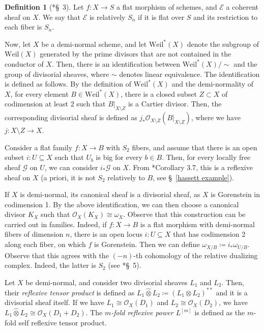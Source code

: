 \documentclass{amsart}
\newcommand{\cE}{\mathcal{E}}
\newcommand{\cG}{\mathcal{G}}
\theoremstyle{definition}
\newtheorem{Def}[theorem]{Definition}
\newcommand{\rar}{\rightarrow}
\def\O#1.{\mathcal {O}_{#1}}
\def\subs#1.{_{#1}}
\begin{document}
\begin{Def}[\cite{HK04}*{\S~3}]Let $f \colon X\to S $ a flat morphism of schemes, and $\cE$ a coherent sheaf on $X$. We say that $\cE$ is relatively $S_n$ if it is flat over $S$ and its restriction to each fiber is $S_n.$
\end{Def}

Now, let $X$ be a demi-normal scheme, and let $\mathrm{Weil}^*(X)$ denote the subgroup of $\mathrm{Weil}(X)$ generated by the prime divisors that are not contained in the conductor of $X$.
Then, there is an identification between $\mathrm{Weil}^*(X)/\sim$ and the group of divisorial sheaves, where $\sim$ denotes linear equivalence.
The identification is defined as follows.
By the definition of $\mathrm{Weil}^*(X)$ and the demi-normality of $X$, for every element $B \in \mathrm{Weil}^*(X)$, there is a closed subset $Z \subset X$ of codimension at least 2 such that $B| \subs X \setminus Z.$ is a Cartier divisor.
Then, the corresponding divisorial sheaf is defined as $j_* \O X \setminus Z. (B| \subs X \setminus Z.)$, where we have $j \colon X \setminus Z \rar X$.

Consider a flat family $f \colon X\to B$ with $S_2$ fibers, and assume that there is an open subset $i \colon U\subseteq X$ such that $U_b$ is big for every $b\in B$.
Then, for every locally free sheaf $\cG$ on $U$, we can consider $i_*\cG$ on $X$.
From \cite{HK04}*{Corollary 3.7}, this is a reflexive sheaf on $X$ (a priori, it is not $S_2$ relatively to $B$, see \S~\ref{hassett example}).

If $X$ is demi-normal, its canonical sheaf is a divisorial sheaf, as $X$ is Gorenstein in codimension 1.
By the above identification, we can then choose a canonical divisor $K_X$ such that $\O X. (K_X) \cong \omega_X$.
Observe that this construction can be carried out in families.
Indeed, if $f \colon X\to B$ is a flat morphism with demi-normal fibers of dimension $n$, there is an open locus $i \colon U\subseteq X$ that has codimension 2 along each fiber, on which $f$ is Gorenstein.
Then we can define $\omega_{X/B} \coloneqq i_*\omega_{U/B}$.
Observe that this agrees with the $(-n)$-th cohomology of the relative dualizing complex.
Indeed, the latter is $S_2$ (see \cite{LN18}*{\S~5}).

Let $X$ be demi-normal, and consider two divisorial sheaves $L_1$ and $L_2$.
Then, their \emph{reflexive tensor product} is defined as $L_1 \hat{\otimes} L_2 \coloneqq (L_1 \otimes L_2)^{**}$ and it is a divisorial sheaf itself.
If we have $L_1 \cong \O X. (D_1)$ and $L_2 \cong \O X. (D_2)$, we have $L_1 \hat{\otimes} L_2 \cong \O X. (D_1+D_2)$.
The \emph{$m$-fold reflexive power $L^{[m]}$} is defined as the $m$-fold self reflexive tensor product.
\end{document}
